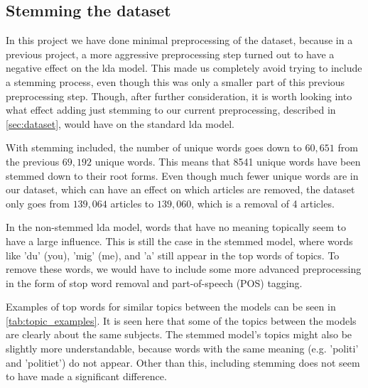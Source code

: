 \subsection{Stemming the dataset}\label{sec:stemming}
In this project we have done minimal preprocessing of the dataset, because in a previous project, a more aggressive preprocessing step turned out to have a negative effect on the \gls{lda} model.
This made us completely avoid trying to include a stemming process, even though this was only a smaller part of this previous preprocessing step.
Though, after further consideration, it is worth looking into what effect adding just stemming to our current preprocessing, described in \autoref{sec:dataset}, would have on the standard \gls{lda} model.

With stemming included, the number of unique words goes down to $60,651$ from the previous $69,192$ unique words.
This means that 8541 unique words have been stemmed down to their root forms.
Even though much fewer unique words are in our dataset, which can have an effect on which articles are removed, the dataset only goes from $139,064$ articles to $139,060$, which is a removal of 4 articles.

In the non-stemmed \gls{lda} model, words that have no meaning topically seem to have a large influence.
This is still the case in the stemmed model, where words like 'du' (you), 'mig' (me), and 'a' still appear in the top words of topics.
To remove these words, we would have to include some more advanced preprocessing in the form of stop word removal and part-of-speech (POS) tagging.

Examples of top words for similar topics between the models can be seen in \autoref{tab:topic_examples}.
It is seen here that some of the topics between the models are clearly about the same subjects.
The stemmed model's topics might also be slightly more understandable, because words with the same meaning (e.g. 'politi' and 'politiet') do not appear.
Other than this, including stemming does not seem to have made a significant difference.

